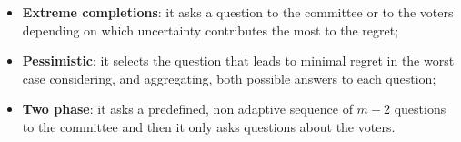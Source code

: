 \documentclass[blockverticalspace=3cm]{tikzposter}
\begin{document}
\begin{columns}
{\begin{itemize}
					\item \textbf{Extreme completions}: it asks a question to the committee or to the voters depending on which uncertainty contributes the most to the regret;
					
					\item \textbf{Pessimistic}: it selects the question that leads to minimal regret in the worst case considering, and aggregating, both possible answers to each question; 
					
					\item \textbf{Two phase}: it asks a predefined, non adaptive sequence of $m-2$ questions to the committee and then it only asks questions about the voters.
				\end{itemize}
			}
			 
			
			
		

\end{columns}
\end{document}

